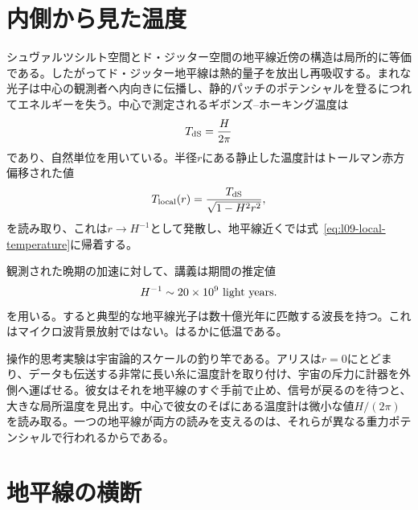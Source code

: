 \begin{classroomqa}
\end{classroomqa}

\section{内側から見た温度}

シュヴァルツシルト空間とド・ジッター空間の地平線近傍の構造は局所的に等価である。したがってド・ジッター地平線は熱的量子を放出し再吸収する。まれな光子は中心の観測者へ内向きに伝播し、静的パッチのポテンシャルを登るにつれてエネルギーを失う。中心で測定されるギボンズ--ホーキング温度は
\begin{equation}
T_{\rm dS}=\frac{H}{2\pi}
\label{eq:l09-de-sitter-temperature}
\end{equation}
であり、自然単位を用いている。半径\(r\)にある静止した温度計はトールマン赤方偏移された値
\begin{equation}
T_{\rm local}(r)=
\frac{T_{\rm dS}}{\sqrt{1-H^2r^2}},
\label{eq:l09-tolman}
\end{equation}
を読み取り、これは\(r\to H^{-1}\)として発散し、地平線近くでは式~\eqref{eq:l09-local-temperature}に帰着する。


観測された晩期の加速に対して、講義は期間の推定値
\begin{equation}
H^{-1}\sim 20\times10^9\ {\rm light\ years}.
\label{eq:l09-lecture-horizon-estimate}
\end{equation}
を用いる。すると典型的な地平線光子は数十億光年に匹敵する波長を持つ。これはマイクロ波背景放射ではない。はるかに低温である。

操作的思考実験は宇宙論的スケールの釣り竿である。アリスは\(r=0\)にとどまり、データも伝送する非常に長い糸に温度計を取り付け、宇宙の斥力に計器を外側へ運ばせる。彼女はそれを地平線のすぐ手前で止め、信号が戻るのを待つと、大きな局所温度を見出す。中心で彼女のそばにある温度計は微小な値\(H/(2\pi)\)を読み取る。一つの地平線が両方の読みを支えるのは、それらが異なる重力ポテンシャルで行われるからである。

\section{地平線の横断}

